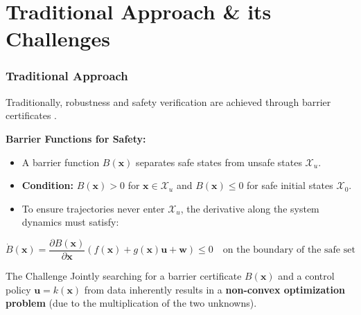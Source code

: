 \documentclass[8pt, hyperref={bookmarks=false},aspectratio=169, xcolor=table]{beamer}
\begin{document}
\section{Traditional Approach \& its Challenges}
\begin{frame}\frametitle{Traditional Approach}
  Traditionally, robustness and safety verification are achieved through barrier certificates \cite{Prajna2004}. 
  
  \vspace{0.3cm}
  \textbf{Barrier Functions for Safety:}
  \begin{itemize}
    \item A barrier function $B(\mathbf{x})$ separates safe states from unsafe states $\mathcal{X}_u$.
    \item \textbf{Condition:} $B(\mathbf{x}) > 0$ for $\mathbf{x} \in \mathcal{X}_u$ and $B(\mathbf{x}) \le 0$ for safe initial states $\mathcal{X}_0$.
    \item To ensure trajectories never enter $\mathcal{X}_u$, the derivative along the system dynamics must satisfy:
  \end{itemize}
  
  \begin{equation*}
    \dot{B}(\mathbf{x}) = \frac{\partial B(\mathbf{x})}{\partial \mathbf{x}} \left( f(\mathbf{x}) + g(\mathbf{x})\mathbf{u} + \mathbf{w} \right) \le 0 \quad \text{on the boundary of the safe set}
  \end{equation*}

  \vspace{0.1cm}
  \begin{block}{The Challenge}
    Jointly searching for a barrier certificate $B(\mathbf{x})$ and a control policy $\mathbf{u} = k(\mathbf{x})$ from data inherently results in a \textbf{non-convex optimization problem} (due to the multiplication of the two unknowns).
  \end{block}
\end{frame}

\end{document}
